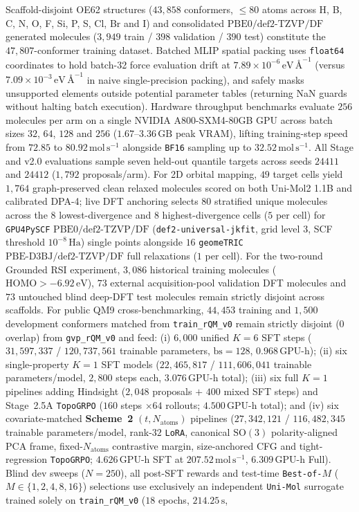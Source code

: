 \documentclass[11pt,a4paper]{article}
\begin{document}
Scaffold-disjoint OE62 structures\cite{stuke2020oe62} ($43{,}858$ conformers, $\le 80$ atoms across H, B, C, N, O, F, Si, P, S, Cl, Br and I) and consolidated $\text{PBE0/def2-TZVP/DF}$ generated molecules ($3{,}949$ train / $398$ validation / $390$ test) constitute the $47{,}807$-conformer training dataset. Batched MLIP spatial packing uses \texttt{float64} coordinates to hold batch-32 force evaluation drift at $7.89\times 10^{-6}\,\text{eV}\,\text{\AA}^{-1}$ (versus $7.09\times 10^{-3}\,\text{eV}\,\text{\AA}^{-1}$ in naive single-precision packing), and safely masks unsupported elements outside potential parameter tables (returning NaN guards without halting batch execution). Hardware throughput benchmarks evaluate $256$ molecules per arm on a single NVIDIA A800-SXM4-80GB GPU across batch sizes $32$, $64$, $128$ and $256$ ($1.67$--$3.36\,\text{GB}$ peak VRAM), lifting training-step speed from $72.85$ to $80.92\,\text{mol}\,\text{s}^{-1}$ alongside \texttt{BF16} sampling up to $32.52\,\text{mol}\,\text{s}^{-1}$. All Stage and v2.0 evaluations sample seven held-out quantile targets across seeds $24411$ and $24412$ ($1{,}792$ proposals/arm). For 2D orbital mapping, $49$ target cells yield $1{,}764$ graph-preserved clean relaxed molecules scored on both Uni-Mol2 1.1B and calibrated DPA-4; live DFT anchoring selects $80$ stratified unique molecules across the $8$ lowest-divergence and $8$ highest-divergence cells ($5$ per cell) for \texttt{GPU4PySCF} $\text{PBE0/def2-TZVP/DF}$ (\texttt{def2-universal-jkfit}, grid level 3, SCF threshold $10^{-8}\,\text{Ha}$) single points alongside $16$ \texttt{geomeTRIC} $\text{PBE-D3BJ/def2-TZVP/DF}$ full relaxations ($1$ per cell). For the two-round Grounded RSI experiment, $3{,}086$ historical training molecules ($\text{HOMO} > -6.92\,\text{eV}$), $73$ external acquisition-pool validation DFT molecules and $73$ untouched blind deep-DFT test molecules remain strictly disjoint across scaffolds. For public QM9 cross-benchmarking, $44{,}453$ training and $1{,}500$ development conformers matched from \texttt{train\_rQM\_v0} remain strictly disjoint ($0$ overlap) from \texttt{gvp\_rQM\_v0} and feed: (i) $6{,}000$ unified $K=6$ SFT steps ($31{,}597{,}337$ / $120{,}737{,}561$ trainable parameters, $\text{bs}=128$, $0.968\,\text{GPU-h}$); (ii) six single-property $K=1$ SFT models ($22{,}465{,}817$ / $111{,}606{,}041$ trainable parameters/model, $2{,}800$ steps each, $3.076\,\text{GPU-h}$ total); (iii) six full $K=1$ pipelines adding Hindsight ($2{,}048$ proposals $+$ $400$ mixed SFT steps) and Stage~2.5A \texttt{TopoGRPO} ($160$ steps $\times 64$ rollouts; $4.500\,\text{GPU-h}$ total); and (iv) six covariate-matched \textbf{Scheme~2} $(t,N_{\text{atoms}})$ pipelines ($27{,}342{,}121$ / $116{,}482{,}345$ trainable parameters/model, rank-$32$ \texttt{LoRA}, canonical $\text{SO}(3)$ polarity-aligned PCA frame, fixed-$N_{\text{atoms}}$ contrastive margin, size-anchored CFG and tight-regression \texttt{TopoGRPO}; $4.626\,\text{GPU-h}$ SFT at $207.52\,\text{mol}\,\text{s}^{-1}$, $6.309\,\text{GPU-h}$ Full). Blind dev sweeps ($N=250$), all post-SFT rewards and test-time \texttt{Best-of-$M$} ($M\in\{1,2,4,8,16\}$) selections use exclusively an independent \texttt{Uni-Mol} surrogate trained solely on \texttt{train\_rQM\_v0} ($18$ epochs, $214.25\,\text{s}$, 
\end{document}
